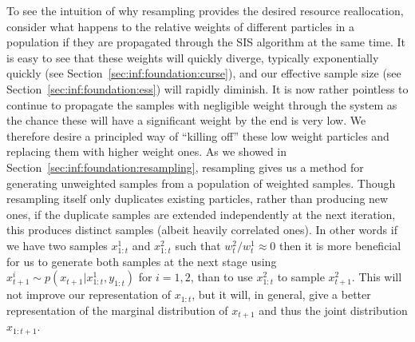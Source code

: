 To see the intuition of why resampling provides the desired resource reallocation, consider what happens 
to the relative weights of different particles in a population if they are propagated through the SIS algorithm at the
same time.  It is easy to see that these weights will quickly diverge, typically exponentially quickly
 (see Section~\ref{sec:inf:foundation:curse}), and our effective sample size 
(see Section~\ref{sec:inf:foundation:ess}) will rapidly diminish.  It is now rather pointless to continue to
propagate the samples with negligible weight through the system as the chance these will have a significant
weight by the end is very low.  We therefore desire a principled way of ``killing off'' these
low weight particles and replacing them with higher weight ones.  As we showed in Section~\ref{sec:inf:foundation:resampling},
resampling gives us a method for generating unweighted samples from a population of weighted samples.
Though resampling itself only duplicates existing particles, rather
than producing new ones, if the duplicate samples are extended independently at the next iteration, this
produces distinct samples (albeit heavily correlated ones).  In other words if we have two samples
$x_{1:t}^1$ and $x_{1:t}^2$ such that $w_t^2/w_t^1 \approx 0$ then it is more beneficial for us to generate both
samples at the next stage using $x_{t+1}^i \sim p(x_{t+1} | x_{1:t}^1, y_{1:t})$ for $i=1,2$, than to use
$x_{1:t}^2$ to sample $x_{t+1}^2$.  This will not improve our representation of $x_{1:t}$, but it will, in
general, give a better representation of the marginal distribution of $x_{t+1}$ and thus the joint distribution
$x_{1:t+1}$.   

